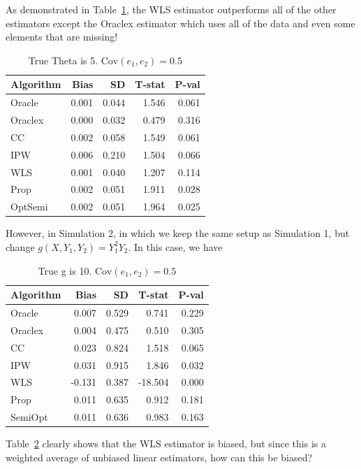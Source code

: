 \documentclass[12pt]{article}
\newcommand{\Cov}{{\text{Cov}}}
\begin{document}
As demonstrated in Table~\ref{tab:sim1}, the WLS estimator outperforms all of 
the other estimators except the Oraclex estimator which uses all of the data 
and even some elements that are missing!

\begin{table}[ht!]
  \caption{True Theta is 5. $\Cov(e_1, e_2) = 0.5$}
  \label{tab:sim1}
  \centering
  \begin{tabular}[t]{lrrrr}
    \toprule
    Algorithm & Bias & SD & T-stat & P-val\\
    \midrule
    Oracle & 0.001 & 0.044 & 1.546 & 0.061\\
    Oraclex & 0.000 & 0.032 & 0.479 & 0.316\\
    CC & 0.002 & 0.058 & 1.549 & 0.061\\
    IPW & 0.006 & 0.210 & 1.504 & 0.066\\
    WLS & 0.001 & 0.040 & 1.207 & 0.114\\
    Prop & 0.002 & 0.051 & 1.911 & 0.028\\
    OptSemi & 0.002 & 0.051 & 1.964 & 0.025\\
    \bottomrule
  \end{tabular}
\end{table}

However, in Simulation 2, in which we keep the same setup as Simulation 1,
but change $g(X, Y_1, Y_2) = Y_1^2 Y_2$. In this case, we have 


\begin{table}[ht!]
  \caption{True g is 10. $\Cov(e_1, e_2) = 0.5$}
  \label{tab:sim2}
  \centering
  \begin{tabular}[t]{lrrrr}
    \toprule
    Algorithm & Bias & SD & T-stat & P-val\\
    \midrule
    Oracle & 0.007 & 0.529 & 0.741 & 0.229\\
    Oraclex & 0.004 & 0.475 & 0.510 & 0.305\\
    CC & 0.023 & 0.824 & 1.518 & 0.065\\
    IPW & 0.031 & 0.915 & 1.846 & 0.032\\
    WLS & -0.131 & 0.387 & -18.504 & 0.000\\
    Prop & 0.011 & 0.635 & 0.912 & 0.181\\
    SemiOpt & 0.011 & 0.636 & 0.983 & 0.163\\
    \bottomrule
  \end{tabular}
\end{table}

Table~\ref{tab:sim2} clearly shows that the WLS estimator is biased, but 
since this is a weighted average of unbiased linear estimators, how 
can this be biased?
\end{document}
